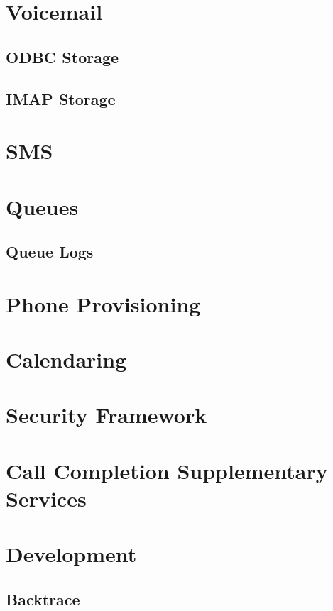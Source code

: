 \documentclass[12pt,a4]{report}
\begin{document}
\chapter{Voicemail}
  \section{ODBC Storage}
  \label{odbcstorage}
  
  \section{IMAP Storage}
  

\chapter{SMS}


\chapter{Queues}
  
  \section{Queue Logs}
  

\chapter{Phone Provisioning}
  

\chapter{Calendaring}
  

\chapter{Security Framework}
  

\chapter{Call Completion Supplementary Services}
  

\chapter{Development}
  \section{Backtrace}
  



%
%
\end{document}
